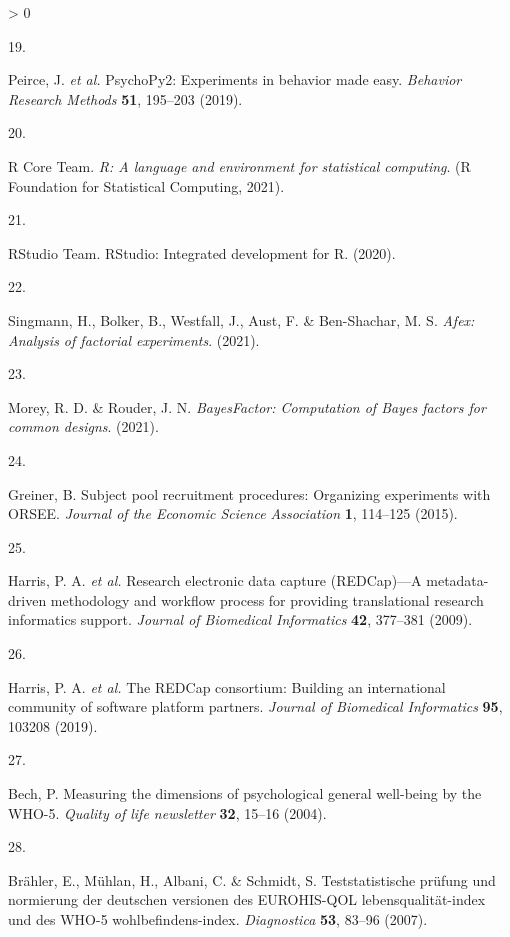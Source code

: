 \documentclass[
  english,
  man,floatsintext]{apa6}
\newlength{\cslhangindent}
\newlength{\csllabelwidth}
\newenvironment{CSLReferences}[2] %
 {%
  \setlength{\parindent}{0pt}
  \ifodd #1 \everypar{\setlength{\hangindent}{\cslhangindent}}\ignorespaces\fi
  \ifnum #2 > 0
  \setlength{\parskip}{#2\baselineskip}
  \fi
 }%
 {}
\newcommand{\CSLLeftMargin}[1]{\parbox[t]{\csllabelwidth}{#1}}
\newcommand{\CSLRightInline}[1]{\parbox[t]{\linewidth - \csllabelwidth}{#1}\break}
\begin{document}
\begin{CSLReferences}{0}{0}
\leavevmode\hypertarget{ref-Peirce2019}{}%
\CSLLeftMargin{19. }
\CSLRightInline{Peirce, J. \emph{et al.} {PsychoPy2}: {Experiments} in behavior made easy. \emph{Behavior Research Methods} \textbf{51}, 195--203 (2019).}

\leavevmode\hypertarget{ref-RCore2021}{}%
\CSLLeftMargin{20. }
\CSLRightInline{R Core Team. \emph{R: A language and environment for statistical computing}. (R Foundation for Statistical Computing, 2021).}

\leavevmode\hypertarget{ref-RStudioTeam2020}{}%
\CSLLeftMargin{21. }
\CSLRightInline{RStudio Team. {RStudio}: {Integrated} development for {R}. (2020).}

\leavevmode\hypertarget{ref-Singmann2021}{}%
\CSLLeftMargin{22. }
\CSLRightInline{Singmann, H., Bolker, B., Westfall, J., Aust, F. \& Ben-Shachar, M. S. \emph{Afex: {A}nalysis of factorial experiments}. (2021).}

\leavevmode\hypertarget{ref-Morey2021}{}%
\CSLLeftMargin{23. }
\CSLRightInline{Morey, R. D. \& Rouder, J. N. \emph{{BayesFactor}: {Computation} of {Bayes} factors for common designs}. (2021).}

\leavevmode\hypertarget{ref-Greiner2015}{}%
\CSLLeftMargin{24. }
\CSLRightInline{Greiner, B. Subject pool recruitment procedures: {Organizing} experiments with {ORSEE}. \emph{Journal of the Economic Science Association} \textbf{1}, 114--125 (2015).}

\leavevmode\hypertarget{ref-Harris2009}{}%
\CSLLeftMargin{25. }
\CSLRightInline{Harris, P. A. \emph{et al.} Research electronic data capture ({REDCap})---{A} metadata-driven methodology and workflow process for providing translational research informatics support. \emph{Journal of Biomedical Informatics} \textbf{42}, 377--381 (2009).}

\leavevmode\hypertarget{ref-Harris2019}{}%
\CSLLeftMargin{26. }
\CSLRightInline{Harris, P. A. \emph{et al.} The {REDCap} consortium: {Building} an international community of software platform partners. \emph{Journal of Biomedical Informatics} \textbf{95}, 103208 (2019).}

\leavevmode\hypertarget{ref-Bech2004}{}%
\CSLLeftMargin{27. }
\CSLRightInline{Bech, P. Measuring the dimensions of psychological general well-being by the WHO-5. \emph{Quality of life newsletter} \textbf{32}, 15--16 (2004).}

\leavevmode\hypertarget{ref-Braehler2007}{}%
\CSLLeftMargin{28. }
\CSLRightInline{Brähler, E., Mühlan, H., Albani, C. \& Schmidt, S. Teststatistische pr{ü}fung und normierung der deutschen versionen des EUROHIS-QOL lebensqualit{ä}t-index und des WHO-5 wohlbefindens-index. \emph{Diagnostica} \textbf{53}, 83--96 (2007).}


\end{CSLReferences}
\end{document}
